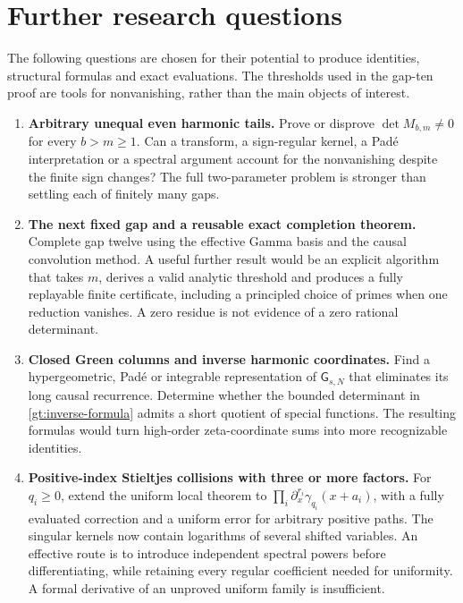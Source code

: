 \section{Further research questions}
\label{questions:section}

The following questions are chosen for their potential to produce
identities, structural formulas and exact evaluations. The thresholds
used in the gap-ten proof are tools for nonvanishing, rather than
the main objects of interest.

\begin{enumerate}[label=\textbf{Q\arabic*.},leftmargin=*]
\item \textbf{Arbitrary unequal even harmonic tails.}
Prove or disprove $\det M_{b,m}\ne0$ for every $b>m\ge1$.
Can a transform, a sign-regular kernel, a Pad\'e interpretation or a
spectral argument account for the nonvanishing despite the finite
sign changes? The full two-parameter problem is stronger than
settling each of finitely many gaps.

\item \textbf{The next fixed gap and a reusable exact completion theorem.}
Complete gap twelve using the effective Gamma basis and the causal
convolution method. A useful further result would be an explicit
algorithm that takes $m$, derives a valid analytic threshold and
produces a fully replayable finite certificate, including a principled
choice of primes when one reduction vanishes. A zero residue is not
evidence of a zero rational determinant.

\item \textbf{Closed Green columns and inverse harmonic coordinates.}
Find a hypergeometric, Pad\'e or integrable representation of
$\mathsf G_{s,N}$ that eliminates its long causal recurrence.
Determine whether the bounded determinant in
\eqref{gt:inverse-formula} admits a short quotient of special functions.
The resulting formulas would turn high-order zeta-coordinate sums
into more recognizable identities.

\item \textbf{Positive-index Stieltjes collisions with three or more factors.}
For $q_i\ge0$, extend the uniform local theorem to
$\prod_i\partial_x^{r_i}\gamma_{q_i}(x+a_i)$, with a fully evaluated
correction and a uniform error for arbitrary positive paths.
The singular kernels now contain logarithms of several shifted
variables. An effective route is to introduce independent spectral
powers before differentiating, while retaining every regular
coefficient needed for uniformity. A formal derivative of an
unproved uniform family is insufficient.


\end{enumerate}
